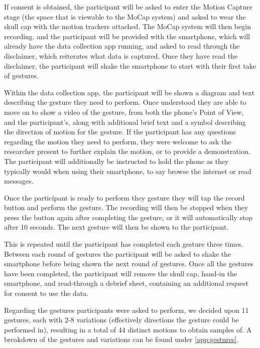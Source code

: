 If consent is obtained, the participant will be asked to enter the Motion Capture stage (the space that is viewable to the MoCap system) and asked to wear the skull cap with the motion trackers attached.
The MoCap system will then begin recording. and the participant will be provided with the smartphone, which will already have the data collection app running, and asked to read through the disclaimer, which reiterates what data is captured. Once they have read the disclaimer, the participant will shake the smartphone to start with their first take of gestures.

Within the data collection app, the participant will be shown a diagram and text describing the gesture they need to perform. Once understood they are able to move on to show a video of the gesture, from both the phone's Point of View, and the participant's, along with additional brief text and a symbol describing the direction of motion for the gesture.
If the participant has any questions regarding the motion they need to perform, they were welcome to ask the researcher present to further explain the motion, or to provide a demonstration.
The participant will additionally be instructed to hold the phone as they typically would when using their smartphone, to say browse the internet or read messages.

Once the participant is ready to perform they gesture they will tap the record button and perform the gesture. The recording will then be stopped when they press the button again after completing the gesture, or it will automatically stop after 10 seconds.
The next gesture will then be shown to the participant.

This is repeated until the participant has completed each gesture three times. Between each round of gestures the participant will be asked to shake the smartphone before being shown the next round of gestures. Once all the gestures have been completed, the participant will remove the skull cap, hand-in the smartphone, and read-through a debrief sheet, containing an additional request for consent to use the data.

Regarding the gestures participants were asked to perform, we decided upon 11 gestures, each with 2-8 variations (effectively directions the gesture could be performed in), resulting in a total of 44 distinct motions to obtain samples of. A breakdown of the gestures and variations can be found under \autoref{app:gestures}.

